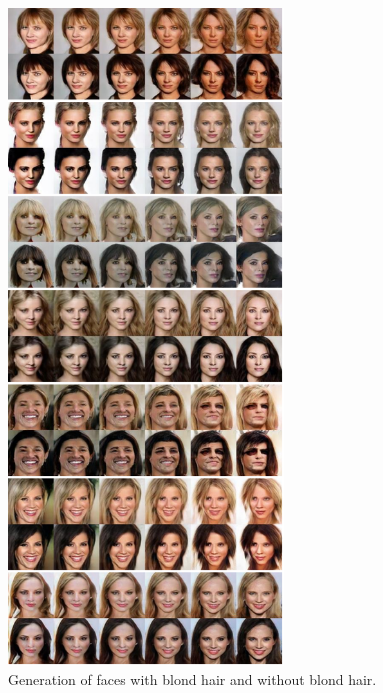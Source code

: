 \begin{figure}[thb!]
\centering
\includegraphics[trim=0in 0in 0in 0in, width=0.65\textwidth]{result_face_blondhair_big3.pdf}
\caption{Generation of faces with blond hair and without blond hair.}
\label{fig::result_blondhair3}
\end{figure}
